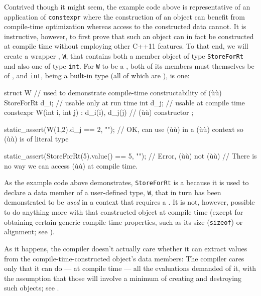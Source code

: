 \noindent Contrived though it might seem, the example code above is representative
of an application of \lstinline!constexpr! where the construction of an
object can benefit from compile-time optimization whereas access to the
constructed data cannot. It is instructive, however, to first prove that
such an object can in fact be constructed at compile time without
employing other C++11 features. To that end, we will create a wrapper
, \lstinline!W!, that contains both a member object of
type \lstinline!StoreForRt! and also one of type \lstinline!int!. For
\lstinline!W! to be a , both of its members must
themselves be of , and \lstinline!int!, being a
built-in type (all of which are ), is one:

\begin{emcppslisting}[emcppsbatch=e4]
struct W  // used to demonstrate compile-time constructability of (ù{}ù)
{
    StoreForRt d_i;                                 // usable only at run time
    int        d_j;                                 // usable at compile time
    constexpr W(int i, int j) : d_i(i), d_j(j) { }  // (ù{}ù) constructor
};

static_assert(W(1,2).d_j == 2, "");
    // OK, can use (ù{}ù) in a (ù{}ù) context so (ù{}ù) is of literal type

static_assert(StoreForRt(5).value() == 5, "");  // Error, (ù{}ù) not (ù{}ù)
    // There is no way we can access (ù{}ù) at compile time.
\end{emcppslisting}
    

\noindent As the example code above demonstrates, \lstinline!StoreForRt! is a
 because it is used to declare a data member of a
user-defined type, \lstinline!W!, that in turn has been demonstrated to be
\emph{used} in a context that requires a .
It is not, however, possible to do anything more with that constructed
object at compile time (except for obtaining certain generic
compile-time properties, such as its size (\lstinline!sizeof!) or
alignment; see ).

As it happens, the compiler doesn't actually care whether it can extract
values from the compile-time-constructed object's data members: The
compiler cares only that it can do --- at compile time --- all the
evaluations demanded of it, with the assumption that those will involve
a minimum of creating and destroying such objects; see
.

